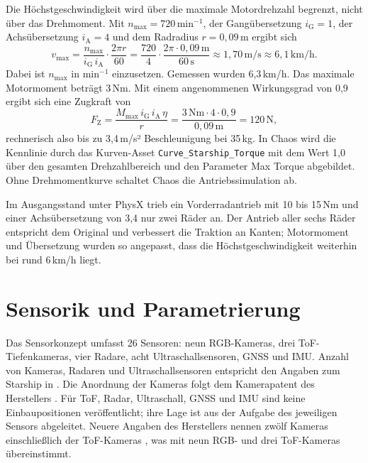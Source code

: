 Die Höchstgeschwindigkeit wird über die maximale Motordrehzahl begrenzt, nicht über das
Drehmoment. Mit $n_\mathrm{max} = 720\,\mathrm{min^{-1}}$, der Gangübersetzung
$i_\mathrm{G} = 1$, der Achsübersetzung $i_\mathrm{A} = 4$ und dem Radradius
$r = 0{,}09\,\mathrm{m}$ ergibt sich
\begin{equation}
  v_\mathrm{max} = \frac{n_\mathrm{max}}{i_\mathrm{G}\, i_\mathrm{A}} \cdot \frac{2\pi r}{60}
  = \frac{720}{4} \cdot \frac{2\pi \cdot 0{,}09\,\mathrm{m}}{60\,\mathrm{s}}
  \approx 1{,}70\,\mathrm{m/s} \approx 6{,}1\,\mathrm{km/h}.
  \label{eq:starship_vmax}
\end{equation}
Dabei ist $n_\mathrm{max}$ in $\mathrm{min^{-1}}$ einzusetzen. Gemessen wurden 6,3\,km/h.
Das maximale Motormoment beträgt 3\,Nm. Mit einem angenommenen Wirkungsgrad von 0,9
ergibt sich eine Zugkraft von
\begin{equation}
  F_\mathrm{Z} = \frac{M_\mathrm{max}\, i_\mathrm{G}\, i_\mathrm{A}\, \eta}{r}
  = \frac{3\,\mathrm{Nm} \cdot 4 \cdot 0{,}9}{0{,}09\,\mathrm{m}} = 120\,\mathrm{N},
  \label{eq:starship_zugkraft}
\end{equation}
rechnerisch also bis zu 3,4\,m/s² Beschleunigung bei 35\,kg. In Chaos wird die
Kennlinie durch das Kurven-Asset \texttt{Curve\_Starship\_Torque} mit dem Wert 1,0 über
den gesamten Drehzahlbereich und den Parameter Max Torque abgebildet. Ohne
Drehmomentkurve schaltet Chaos die Antriebssimulation ab.

Im Ausgangsstand unter PhysX trieb ein Vorderradantrieb mit 10 bis 15\,Nm und einer
Achsübersetzung von 3,4 nur zwei Räder an. Der Antrieb aller sechs Räder entspricht dem
Original und verbessert die Traktion an Kanten; Motormoment und Übersetzung wurden so
angepasst, dass die Höchstgeschwindigkeit weiterhin bei rund 6\,km/h liegt.

\section{Sensorik und Parametrierung}
\label{sec:starship_sensorik}

Das Sensorkonzept umfasst 26 Sensoren: neun RGB-Kameras, drei ToF-Tiefenkameras, vier
Radare, acht Ultraschallsensoren, GNSS und IMU. Anzahl von Kameras, Radaren und
Ultraschallsensoren entspricht den Angaben zum Starship in
\textcite{mit_technology_review_2018}. Die Anordnung der Kameras folgt dem Kamerapatent
des Herstellers \parencite{starship_patent_kamera}. Für ToF, Radar, Ultraschall, GNSS und
IMU sind keine Einbaupositionen veröffentlicht; ihre Lage ist aus der Aufgabe des
jeweiligen Sensors abgeleitet. Neuere Angaben des Herstellers nennen zwölf Kameras
einschließlich der ToF-Kameras \parencite{starship_robots}, was mit neun RGB- und drei
ToF-Kameras übereinstimmt.

